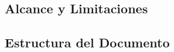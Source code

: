 \subsection{Alcance y Limitaciones}
\label{subsec:alcance-limitaciones}


\subsection{Estructura del Documento}
\label{subsec:estructura-documento}

